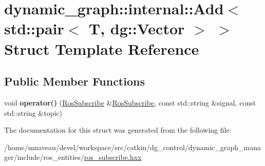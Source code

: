 \hypertarget{structdynamic__graph_1_1internal_1_1Add_3_01std_1_1pair_3_01T_00_01dg_1_1Vector_01_4_01_4}{}\section{dynamic\+\_\+graph\+:\+:internal\+:\+:Add$<$ std\+:\+:pair$<$ T, dg\+:\+:Vector $>$ $>$ Struct Template Reference}
\label{structdynamic__graph_1_1internal_1_1Add_3_01std_1_1pair_3_01T_00_01dg_1_1Vector_01_4_01_4}
\subsection*{Public Member Functions}
\begin{DoxyCompactItemize}
\item 
void {\bfseries operator()} (\hyperlink{classdynamic__graph_1_1RosSubscribe}{Ros\+Subscribe} \&\hyperlink{classdynamic__graph_1_1RosSubscribe}{Ros\+Subscribe}, const std\+::string \&signal, const std\+::string \&topic)\hypertarget{structdynamic__graph_1_1internal_1_1Add_3_01std_1_1pair_3_01T_00_01dg_1_1Vector_01_4_01_4_af6641e84d4c979827f56b5df1570b1a5}{}\label{structdynamic__graph_1_1internal_1_1Add_3_01std_1_1pair_3_01T_00_01dg_1_1Vector_01_4_01_4_af6641e84d4c979827f56b5df1570b1a5}

\end{DoxyCompactItemize}


The documentation for this struct was generated from the following file\+:\begin{DoxyCompactItemize}
\item 
/home/mnaveau/devel/workspace/src/catkin/dg\+\_\+control/dynamic\+\_\+graph\+\_\+manager/include/ros\+\_\+entities/\hyperlink{ros__subscribe_8hxx}{ros\+\_\+subscribe.\+hxx}\end{DoxyCompactItemize}
